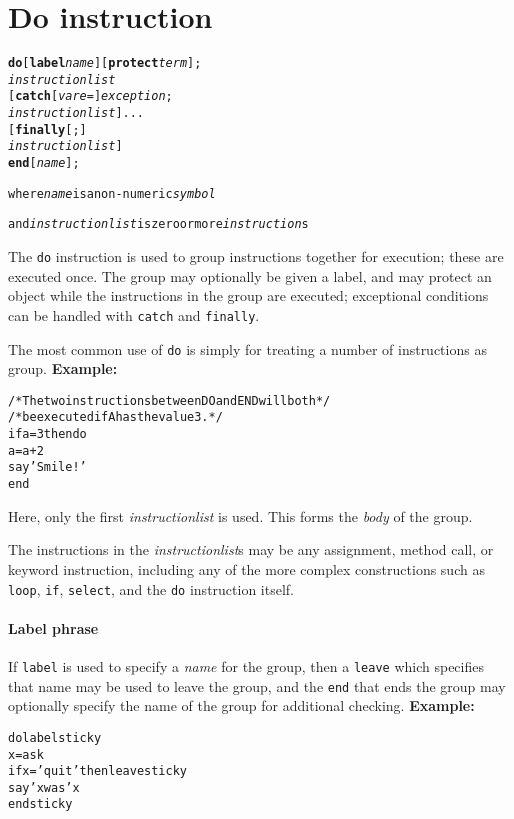 \chapter{Do instruction}\label{"id"}
\index{,}
\index{,}
\index{,}
\begin{shaded}
\begin{alltt}
\textbf{do} [\textbf{label} \emph{name}] [\textbf{protect} \emph{term}];
        \emph{instructionlist}
    [\textbf{catch} [\emph{vare} =] \emph{exception};
        \emph{instructionlist}]...
    [\textbf{finally}[;]
        \emph{instructionlist}]
    \textbf{end} [\emph{name}];

where \emph{name} is a non-numeric \emph{symbol}

and \emph{instructionlist} is zero or more \emph{instruction}s
\end{alltt}
\end{shaded}
 The \texttt{do} instruction is used to group instructions together for
execution; these are executed once.
The group may optionally be given a label, and may protect an object
while the instructions in the group are executed; exceptional conditions
can be handled with \texttt{catch} and \texttt{finally}.
 
The most common use of \texttt{do} is simply for treating a number of
instructions as group.
 \textbf{Example:}
\begin{alltt}
/* The two instructions between DO and END will both */
/* be executed if A has the value 3.                 */
if a=3 then do
  a=a+2
  say 'Smile!'
  end
\end{alltt}
Here, only the first \emph{instructionlist} is used.
This forms the \emph{body} of the group.
 
The instructions in the \emph{instructionlist}s may be any assignment,
method call, or keyword instruction, including any of the more complex
constructions such as \texttt{loop}, \texttt{if}, \texttt{select}, and
the \texttt{do} instruction itself.
\subsubsection{Label phrase}
 
If \texttt{label} is used to specify a \emph{name} for the group,
then a \texttt{leave} which specifies that name may be used to leave the
group, and the \texttt{end} that ends the group may optionally specify
the name of the group for additional checking.
 \textbf{Example:}
\begin{alltt}
do label sticky
  x=ask
  if x='quit' then leave sticky
  say 'x was' x
  end sticky
\end{alltt}
